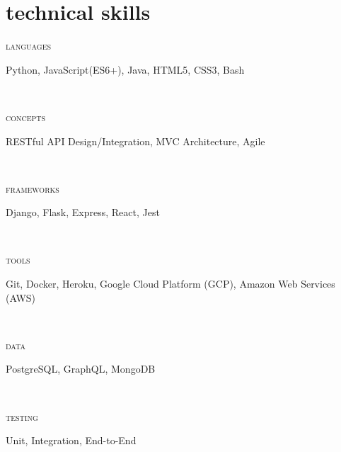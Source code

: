 \documentclass[letterpaper, 11pt]{article}
\newcommand{\skillentry}[2]{
    \begin{minipage}[t]{.15\linewidth}
        \hfill \textsc{#1}
        \end{minipage}
        \hfill\vline\hfill
        \begin{minipage}[t]{.80\linewidth}
        #2
        \end{minipage}\\
    }
\begin{document}
    \section{technical skills}

    \skillentry{languages}{Python, JavaScript(ES6+), Java, HTML5, CSS3, Bash}
    \skillentry{concepts}{RESTful API Design/Integration, MVC Architecture, Agile}
    \skillentry{frameworks}{Django, Flask, Express, React, Jest}
    \skillentry{tools}{Git, Docker, Heroku, Google Cloud Platform (GCP), Amazon Web Services (AWS) }
    \skillentry{data}{PostgreSQL, GraphQL, MongoDB}
    \skillentry{testing}{Unit, Integration, End-to-End}
\end{document}
